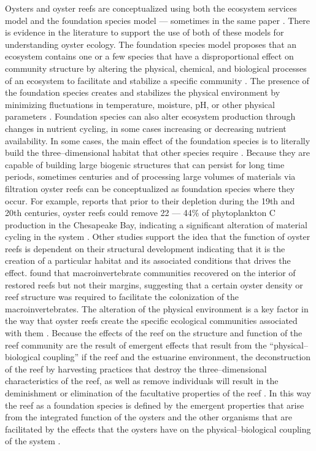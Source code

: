 \documentclass{article}
\begin{document}
Oysters and oyster reefs are conceptualized using both the ecosystem services model and the foundation species model --- sometimes in the same paper \cite{mercaldo-allen_oyster_2023}. There is evidence in the literature to support the use of both of these models for understanding oyster ecology. The foundation species model proposes that an ecosystem contains one or a few species that have a disproportional effect on community structure by altering the physical, chemical, and biological processes of an ecosystem to facilitate and stabilize a specific community \cite{fields_foundation_2022}. The presence of the foundation species creates and stabilizes the physical environment by minimizing fluctuations in temperature, moisture, pH, or other physical parameters \cite{ellison_loss_2005}. Foundation species can also alter ecosystem production through changes in nutrient cycling, in some cases increasing \cite{fields_foundation_2022} or decreasing \cite{ellison_loss_2005} nutrient availability. In some cases, the main effect of the foundation species is to literally build the three--dimensional habitat that other species require \cite{mercaldo-allen_oyster_2023}. Because they are capable of building large biogenic structures that can persist for long time periods, sometimes centuries \cite{lockwood_conservation_2019} and of processing large volumes of materials via filtration \cite{newell_ecological_1988} oyster reefs can be conceptualized as foundation species where they occur. For example,  reports that prior to their depletion during the 19th and 20th centuries, oyster reefs could remove 22 --- 44\% of phytoplankton C production in the Chesapeake Bay, indicating a significant alteration of material cycling in the system \cite{fields_foundation_2022}. Other studies support the idea that the function of oyster reefs is dependent on their structural development indicating that it is the creation of a particular habitat and its associated conditions that drives the effect.  found that macroinvertebrate communities recovered on the interior of restored reefs but not their margins, suggesting that a certain oyster density or reef structure was required to facilitate the colonization of the macroinvertebrates. The alteration of the physical environment is a key factor in the way that oyster reefs create the specific ecological communities associated with them \cite{lenihan_physical_1999, searles_oyster_2022}. Because the effects of the reef on the structure and function of the reef community are the result of emergent effects that result from the ``physical--biological coupling'' if the reef and the estuarine environment, the deconstruction of the reef by harvesting practices that destroy the three--dimensional characteristics of the reef, as well as remove individuals will result in the deminishment or elimination of the facultative properties of the reef \cite{lenihan_physical_1999}. In this way the reef as a foundation species is defined by the emergent properties that arise from the integrated function of the oysters and the other organisms that are facilitated by the effects that the oysters have on the physical--biological coupling of the system \cite{lenihan_physical_1999, ellison_loss_2005, angelini_interactions_2011}. 
\end{document}
